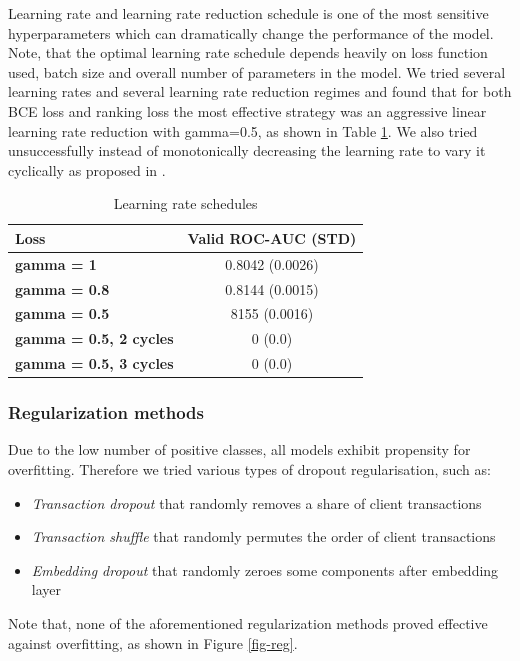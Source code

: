 \documentclass[sigconf]{acmart}
\begin{document}
Learning rate and learning rate reduction schedule is one of the most sensitive hyperparameters which can dramatically change the performance of the model.
Note, that the optimal learning rate schedule depends heavily on loss function used, batch size and overall number of parameters in the model. 
We tried several learning rates and several learning rate reduction regimes and found that for both BCE loss and ranking loss the most effective strategy was an aggressive linear learning rate reduction with gamma=0.5, as shown in Table \ref{tab-lr}. We also tried unsuccessfully instead of monotonically decreasing the learning rate to vary it cyclically as proposed in \cite{smith2017cyclical}.

\begin{table}[ht]
\caption{Learning rate schedules}
\begin{tabular}{ | l | c |  }
\hline
\textbf{Loss} & \textbf{Valid ROC-AUC (STD)} \\
\hline
\textbf{gamma = 1} & 0.8042 (0.0026)  \\
\textbf{gamma = 0.8} & 0.8144 (0.0015)  \\
\textbf{gamma = 0.5} & 8155 (0.0016)  \\
\textbf{gamma = 0.5, 2 cycles} & 0 (0.0)  \\
\textbf{gamma = 0.5, 3 cycles} & 0 (0.0)  \\
\hline
\end{tabular}
\label{tab-lr}
\end{table}

\subsubsection{Regularization methods}

Due to the low number of positive classes, all models exhibit propensity for overfitting. Therefore we tried various types of dropout regularisation, such as:
\begin{itemize}
\item \textit{Transaction dropout} that randomly removes a share of client transactions
\item \textit{Transaction shuffle} that randomly permutes the order of client transactions
\item \textit{Embedding dropout} that randomly zeroes some components after embedding layer
\end{itemize}
Note that, none of the aforementioned regularization methods proved effective against overfitting, as shown in Figure \ref{fig-reg}.
\end{document}
